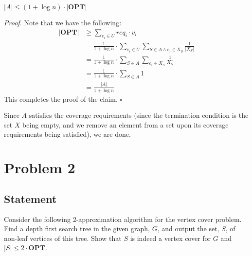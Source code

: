 \documentclass[a4paper]{article}
\newenvironment{proof}{\begin{breakbox}\textit{Proof.}}{\hfill$\square$\end{breakbox}}
\newcommand{\nl}{\vspace{0.2cm}\\}
\newcommand{\OPT}{\mathbf{OPT}}
\begin{document}
\begin{claim}
    $|A| \le (1 + \log n) \cdot |\OPT|$
\end{claim}
\begin{proof}
    Note that we have the following:
    \begin{align*}
        |\OPT| &\ge \sum_{e_i \in U} req_i \cdot v_i\\
               &= \frac{1}{1 + \log n} \cdot \sum_{e_i \in U} \sum_{S \in A \land e_i \in X_S} \frac{1}{|X_S|}\\
               &= \frac{1}{1 + \log n} \cdot \sum_{S \in A} \sum_{e_i \in X_S} \frac{1}{X_S}\\
               &= \frac{1}{1 + \log n} \cdot \sum_{S \in A} 1\\
               &= \frac{|A|}{1 + \log n}
    \end{align*}
    This completes the proof of the claim.
\end{proof}
Since $A$ satisfies the coverage requirements (since the termination condition is the set $X$ being empty, and we remove an element from a set upon its coverage requirements being satisfied), we are
done.\nl

\newpage

\section{Problem 2}
\subsection{Statement}
Consider the following 2-approximation algorithm for the vertex cover problem. Find a depth first search tree in the given graph, $G$, and output the set, $S$, of non-leaf vertices of this tree. Show
that $S$ is indeed a vertex cover for $G$ and $|S| \le 2 \cdot \OPT$.
\end{document}

